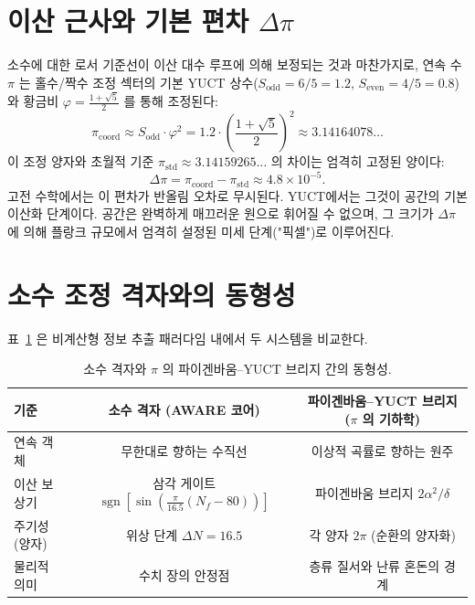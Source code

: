 \documentclass[12pt,a4paper]{article}
\newcommand{\Sodd}{S_{\mathrm{odd}}}
\newcommand{\Seven}{S_{\mathrm{even}}}
\begin{document}
	\section{이산 근사와 기본 편차 $\Delta\pi$}
	\label{sec:delta-pi}
	
	소수에 대한 로서 기준선이 이산 대수 루프에 의해 보정되는 것과 마찬가지로, 연속 수 $\pi$ 는 홀수/짝수 조정 섹터의 기본 YUCT 상수($\Sodd = 6/5 = 1.2$, $\Seven = 4/5 = 0.8$)와 황금비 $\varphi = \frac{1+\sqrt{5}}{2}$ 를 통해 조정된다:
	\begin{equation}
		\pi_{\mathrm{coord}} \approx \Sodd \cdot \varphi^2 = 1.2 \cdot \left(\frac{1+\sqrt{5}}{2}\right)^2 \approx 3.14164078\ldots
		\label{eq:pi-approx}
	\end{equation}
	이 조정 양자와 초월적 기준 $\pi_{\mathrm{std}} \approx 3.14159265\ldots$ 의 차이는 엄격히 고정된 양이다:
	\begin{equation}
		\Delta\pi = \pi_{\mathrm{coord}} - \pi_{\mathrm{std}} \approx 4.8 \times 10^{-5}.
		\label{eq:delta-pi-val}
	\end{equation}
	고전 수학에서는 이 편차가 반올림 오차로 무시된다. YUCT에서는 그것이 공간의 기본 이산화 단계이다. 공간은 완벽하게 매끄러운 원으로 휘어질 수 없으며, 그 크기가 $\Delta\pi$ 에 의해 플랑크 규모에서 엄격히 설정된 미세 단계("픽셀")로 이루어진다.
	
	\section{소수 조정 격자와의 동형성}
	\label{sec:isomorphism}
	
	표~\ref{tab:isomorphism} 은 비계산형 정보 추출 패러다임 내에서 두 시스템을 비교한다.
	
	\begin{table}[H]
		\centering
		\scriptsize
		\caption{소수 격자와 $\pi$ 의 파이겐바움–YUCT 브리지 간의 동형성.}
		\label{tab:isomorphism}
		\begin{tabular}{@{}lcc@{}}
			\toprule
			\textbf{기준} & \textbf{소수 격자 (AWARE 코어)} & \textbf{파이겐바움–YUCT 브리지 ($\pi$ 의 기하학)} \\
			\midrule
			연속 객체 & 무한대로 향하는 수직선 & 이상적 곡률로 향하는 원주 \\
			이산 보상기 & 삼각 게이트 $\operatorname{sgn}[\sin(\frac{\pi}{16.5}(N_f-80))]$ & 파이겐바움 브리지 $2\alpha^2/\delta$ \\
			주기성 (양자) & 위상 단계 $\Delta N = 16.5$ & 각 양자 $2\pi$ (순환의 양자화) \\
			물리적 의미 & 수치 장의 안정점 & 층류 질서와 난류 혼돈의 경계 \\
			\bottomrule
		\end{tabular}
	\end{table}
	
\end{document}
